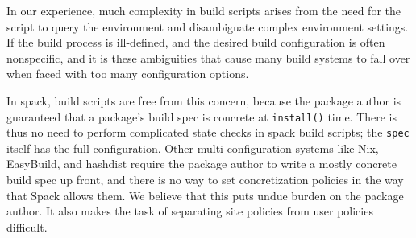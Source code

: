 In our experience, much complexity in build scripts arises from the need for the script to
query the environment and disambiguate complex environment settings.  If the build process is
ill-defined, and the desired build configuration is often nonspecific, and it is these
ambiguities that cause many build systems to fall over when faced with too many configuration
options.

In spack, build scripts are free from this concern, because the package author
is guaranteed that a package's build spec is concrete at {\tt install()} time.
There is thus no need to perform complicated state checks in spack build scripts;
the {\tt spec} itself has the full configuration.  Other multi-configuration systems like Nix, 
EasyBuild, and hashdist require the package author to write a mostly concrete build
spec up front, and there is no way to set concretization policies in the way that Spack
allows them.  We believe that this puts undue burden on the package author.  It also makes
the task of separating site policies from user policies difficult.













